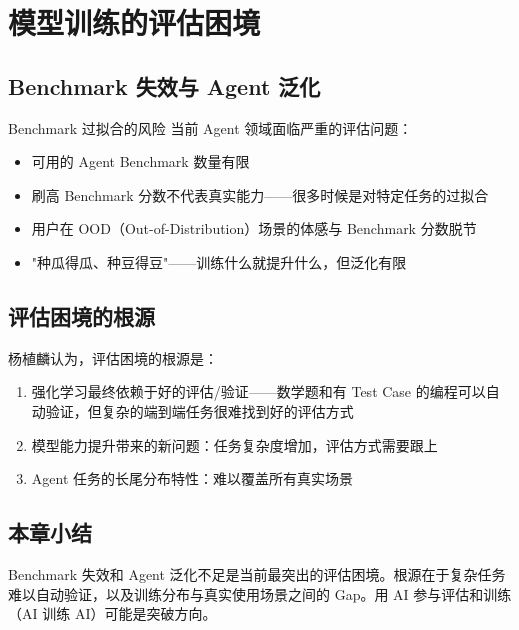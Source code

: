 \section{模型训练的评估困境}

\subsection{Benchmark 失效与 Agent 泛化}

\begin{warningbox}{Benchmark 过拟合的风险}
当前 Agent 领域面临严重的评估问题：
\begin{itemize}
    \item 可用的 Agent Benchmark 数量有限
    \item 刷高 Benchmark 分数不代表真实能力——很多时候是对特定任务的过拟合
    \item 用户在 OOD（Out-of-Distribution）场景的体感与 Benchmark 分数脱节
    \item "种瓜得瓜、种豆得豆"——训练什么就提升什么，但泛化有限
\end{itemize}
\end{warningbox}

\subsection{评估困境的根源}

杨植麟认为，评估困境的根源是：

\begin{enumerate}
    \item 强化学习最终依赖于好的评估/验证——数学题和有 Test Case 的编程可以自动验证，但复杂的端到端任务很难找到好的评估方式
    \item 模型能力提升带来的新问题：任务复杂度增加，评估方式需要跟上
    \item Agent 任务的长尾分布特性：难以覆盖所有真实场景
\end{enumerate}

\subsection{本章小结}

Benchmark 失效和 Agent 泛化不足是当前最突出的评估困境。根源在于复杂任务难以自动验证，以及训练分布与真实使用场景之间的 Gap。用 AI 参与评估和训练（AI 训练 AI）可能是突破方向。


